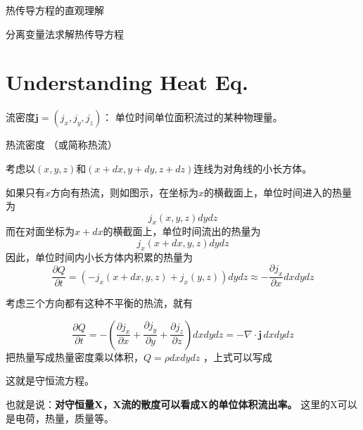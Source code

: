 \documentclass[CJK]{beamer}
\date{}
\begin{document}

\begin{frame}
  \bch
  \bitem
\item{\Large 热传导方程的直观理解}
\item{\Large 分离变量法求解热传导方程}
  \eitem
  \ech
\end{frame}

\section{Understanding Heat Eq.}


\begin{frame}
  \bch
  流密度$ \mathbf{j} = (j_x, j_y, j_z) $： 单位时间单位面积流过的某种物理量。
  
  \bex
  热流密度 （或简称热流）

  \eex  

  \ech
\end{frame}


\begin{frame}
  \bch
{\small
  考虑以$(x, y, z)$和$(x+dx, y+dy, z+dz)$连线为对角线的小长方体。
  
  如果只有$x$方向有热流，则如图示，在坐标为$x$的横截面上，单位时间进入的热量为
  $$j_x(x, y, z) dy dz$$
  而在对面坐标为$x+dx$的横截面上，单位时间流出的热量为
  $$ j_x(x+dx,y,z)dydz$$
  因此，单位时间内小长方体内积累的热量为
  $$ \frac{\partial Q}{\partial t} = (-j_x(x+dx, y, z) + j_x(y, z))dy dz \approx  - \frac{\partial j_x}{\partial x} dxdydz $$
  
  }
  \ech
\end{frame}




\begin{frame}
  \bch
{\small
  考虑三个方向都有这种不平衡的热流，就有

  $$ \frac{\partial Q}{\partial t} = - \left(\frac{\partial j_x}{\partial x} + \frac{\partial j_y}{\partial y} + \frac{\partial j_z}{\partial z}\right)  dxdydz = -\nabla\cdot \mathbf{j} \, dx dy dz $$
  把热量写成热量密度乘以体积，$Q = \rho dxdydz$ ，上式可以写成
}

这就是守恒流方程。

也就是说：{\blue \bf 对守恒量X，X流的散度可以看成X的单位体积流出率。} 这里的X可以是电荷，热量，质量等。

  \ech
\end{frame}
\end{document}
